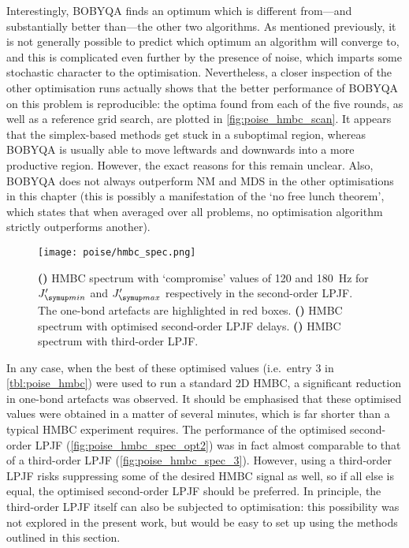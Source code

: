 Interestingly, BOBYQA finds an optimum which is different from---and substantially better than---the other two algorithms.
As mentioned previously, it is not generally possible to predict which optimum an algorithm will converge to, and this is complicated even further by the presence of noise, which imparts some stochastic character to the optimisation.
Nevertheless, a closer inspection of the other optimisation runs actually shows that the better performance of BOBYQA on this problem is reproducible: the optima found from each of the five rounds, as well as a reference grid search, are plotted in \cref{fig:poise_hmbc_scan}.
It appears that the simplex-based methods get stuck in a suboptimal region, whereas BOBYQA is usually able to move leftwards and downwards into a more productive region.
However, the exact reasons for this remain unclear.
Also, BOBYQA does not always outperform NM and MDS in the other optimisations in this chapter (this is possibly a manifestation of the `no free lunch theorem'\autocite{Wolpert1997IEEETEC}, which states that when averaged over all problems, no optimisation algorithm strictly outperforms another).

\begin{figure}[htb]
    \centering
    \texttt{[image: poise/hmbc\_spec.png]}%
    {\label{fig:poise_hmbc_spec_unopt2}}%
    {\label{fig:poise_hmbc_spec_opt2}}%
    {\label{fig:poise_hmbc_spec_3}}%
    \caption[HMBC spectra before and after optimisation]{
        \textbf{()} HMBC spectrum with `compromise' values of 120 and \qty{180}{\Hz} for $\Jmin'$ and $\Jmax'$ respectively in the second-order LPJF.
        The one-bond artefacts are highlighted in red boxes.
        \textbf{()} HMBC spectrum with optimised second-order LPJF delays.
        \textbf{()} HMBC spectrum with third-order LPJF.
    }
    \label{fig:poise_hmbc_spec}
\end{figure}

In any case, when the best of these optimised values (i.e.\ entry 3 in \cref{tbl:poise_hmbc}) were used to run a standard 2D HMBC, a significant reduction in one-bond artefacts was observed.
It should be emphasised that these optimised values were obtained in a matter of several minutes, which is far shorter than a typical HMBC experiment requires.
The performance of the optimised second-order LPJF (\cref{fig:poise_hmbc_spec_opt2}) was in fact almost comparable to that of a third-order LPJF (\cref{fig:poise_hmbc_spec_3}).
However, using a third-order LPJF risks suppressing some of the desired HMBC signal as well, so if all else is equal, the optimised second-order LPJF should be preferred.
In principle, the third-order LPJF itself can also be subjected to optimisation: this possibility was not explored in the present work, but would be easy to set up using the methods outlined in this section.


